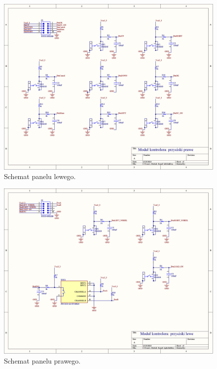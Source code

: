 \begin{figure}
    \begin{center}
        \includegraphics[width = 21cm]{zalaczniki/przyciski/Przyciski_prawe_Strona_1.jpg}
        \caption{Schemat panelu lewego.}
    \end{center}
\end{figure}

\begin{figure}
    \begin{center}
        \includegraphics[width = 21cm]{zalaczniki/przyciski/Przyciski_lewe_Strona_1.jpg}
        \caption{Schemat panelu prawego.}
    \end{center}
\end{figure}

